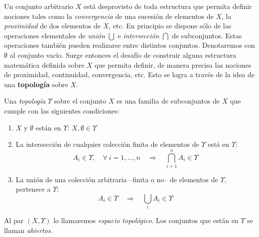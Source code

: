{}
\label{s:WL:EspacioTopologico}

Un conjunto  arbitrario $X$  est\'a desprovisto de  toda estructura  que permita
definir nociones tales como la {\it convergencia} de una sucesi\'on de elementos
de  $X$, la  {\it proximidad}  de dos  elementos de  $X$, etc.  En  principio se
dispone s\'olo de las operaciones  elementales de {\it uni\'on} $\bigcup$ e {\it
  intersecci\'on} $\bigcap$ de  subconjuntos. Estas operaciones tambi\'en pueden
realizarse entre  distintos conjuntos.  Denotaremos con $\emptyset$  al conjunto
vac\'io. Surge entonces el desaf\'io de construir alguna estructura matem\'atica
definida  sobre $X$  que  permita definir,  de  manera precisa  las nociones  de
proximidad, continuidad, convergencia, etc. Esto  se logra a trav\'es de la idea
de una {\bf topolog\'ia} sobre $X$.

\begin{definicion}[Topolog\'ia]
  Una  {\it topolog\'ia}  $\Upsilon$ sobre  el conjunto  $X$ es  una  familia de
  subconjuntos de $X$ que cumple con las siguientes condiciones:
  \begin{enumerate}
  \item $X$ y $\emptyset$ est\'an en $\Upsilon$: $X, \emptyset \in \Upsilon$
  \item  La  intersecci\'on de  cualquier  colecci\'on  finita  de elementos  de
    $\Upsilon$ est\'a en $\Upsilon$:
    \[
    A_i \in  \Upsilon, \quad \forall  \: i  = 1 ,  \ldots , n  \quad \Rightarrow
    \quad \bigcap_{i=1}^n A_i \in \Upsilon
    \]
  \item La uni\'on de una colecci\'on arbitraria --finita o no-- de elementos de
    $\Upsilon$, pertenece a $\Upsilon$:
    \[
    A_i \in \Upsilon \quad \Rightarrow \quad \bigcup_i A_i \in \Upsilon
    \]
  \end{enumerate}
\end{definicion}

\begin{definicion}
  Al par $(X,\Upsilon)$ lo  llamaremos {\it espacio topol\'ogico}. Los conjuntos
  que est\'an en $\Upsilon$ se llaman {\it abiertos}.
\end{definicion}


